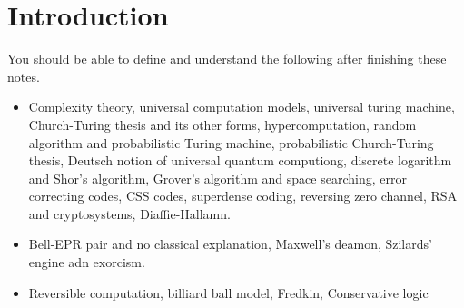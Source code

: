 \chapter{Introduction}
You should be able to define and understand the following after finishing these notes. 
\begin{itemize}
    \item Complexity theory, universal computation models, universal turing machine, Church-Turing thesis and its other forms, hypercomputation, random algorithm and probabilistic Turing machine, probabilistic Church-Turing thesis, Deutsch notion of universal quantum computiong, discrete logarithm and Shor's algorithm, Grover's algorithm and space searching, error correcting codes, CSS codes, superdense coding, reversing zero channel, RSA and cryptosystems, Diaffie-Hallamn.
    \item Bell-EPR pair and no classical explanation, Maxwell's deamon, Szilards' engine adn exorcism. 
    \item Reversible computation, billiard ball model, Fredkin, Conservative logic
\end{itemize}

